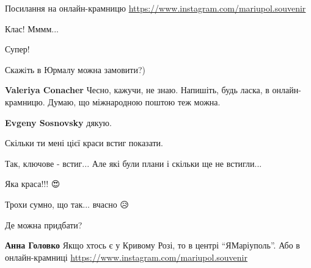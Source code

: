  
 
 
 
 

\qqSecCmt


Посилання на онлайн-крамницю \url{https://www.instagram.com/mariupol.souvenir}


Клас! Мммм...


Супер!


Скажiть в Юрмалу можна замовити?)

\begin{itemize} %
\textbf{Valeriya Conacher} Чесно, кажучи, не знаю. Напишіть, будь ласка, в онлайн-крамницю. Думаю, що міжнародною поштою теж можна.

\textbf{Evgeny Sosnovsky} дякую.
\end{itemize} %


Скільки ти мені цієї краси встиг показати.

\begin{itemize} %
Так, ключове - встиг... Але які були плани і скільки ще не встигли...
\end{itemize} %


Яка краса!!! 😍🫶🥰


Трохи сумно, що так... вчасно 😥

Де можна придбати?

\begin{itemize} %
\textbf{Анна Головко} Якщо хтось є у Кривому Розі, то в центрі \enquote{ЯМаріуполь}. Або в онлайн-крамниці 
\url{https://www.instagram.com/mariupol.souvenir}
\end{itemize} %



